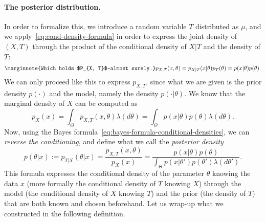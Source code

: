 \documentclass[
	fontsize=11pt, %
	twoside=false, %
	numbers=noenddot, %
]{kaobook}
\begin{document}
\paragraph{The posterior distribution.} %


In order to formalize this, we introduce a random variable $T$ distributed as $\mu$, and
we apply~\eqref{eq:cond-density-formula} in order to express the joint density of $(X, T)$ through the product of the conditional density of $X | T$ and the density of $T$:
\begin{equation*}
	\marginnote{Which holds $P_{X, T}$-almost surely.}
	p_{X, T}(x, \theta) = p_{X | T}(x | \theta) p_T(\theta) = p(x | \theta) p(\theta).
\end{equation*}
We can only proceed like this to express $p_{X, T}$, since what we are given is the prior density $p(\cdot)$ and the model, namely the density $p(\cdot | \theta)$.
We know that the marginal density of $X$ can be computed as
\begin{equation*}
	p_X(x) = \int_\Theta p_{X, T}(x, \theta) \lambda(d \theta) 
	= \int_\Theta p(x | \theta) p(\theta) \lambda(d \theta).
\end{equation*}
Now, using the Bayes formula~\eqref{eq:bayes-formula-conditional-densities}, we can \emph{reverse the conditioning}, and define what we call the \emph{posterior density}
\begin{equation*}
	p(\theta | x) := p_{T | X}(\theta | x) = \frac{p_{X, T}(x, \theta)}{p_X(x)} 
	=  \frac{p(x | \theta) p(\theta)}{\int_\Theta p(x | \theta') p(\theta') \lambda(d \theta')}.
\end{equation*}
This formula expresses the conditional density of the parameter $\theta$ knowing the data $x$ (more formally the conditional density of $T$ knowing $X$) through the model (the conditional density of $X$ knowing $T$) and the prior (the density of $T$) that are both known and chosen beforehand.
Let us wrap-up what we constructed in the following definition.
\end{document}
